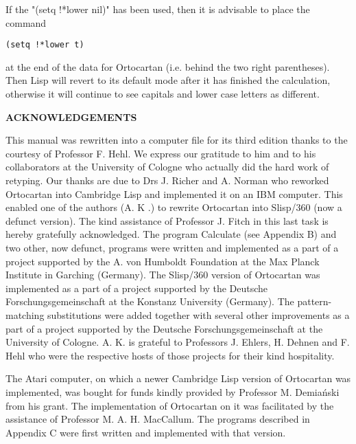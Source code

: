 If the "(setq !*lower nil)" has been used, then it is advisable to place the
command

\bigskip

\begin{verbatim}
(setq !*lower t)
\end{verbatim}

\bigskip

\noindent at the end of the data for Ortocartan (i.e. behind the two right
parentheses). Then Lisp will revert to its default mode after it has finished
the calculation, otherwise it will continue to see capitals and lower case
letters as different.

\bigskip

\bigskip

\bigskip

\centerline {\Large {\bf {ACKNOWLEDGEMENTS}}}

\nopagebreak

\bigskip

This manual was rewritten into a computer file for  its
     third  edition  thanks to the courtesy of Professor F. Hehl.
     We express our gratitude to him and to his  collaborators  at
     the  University of Cologne who actually did the hard work of
     retyping. Our thanks are due to Drs J. Richer and A.  Norman
who reworked Ortocartan into Cambridge Lisp  and  implemented it on an IBM
computer. This enabled one of the authors (A. K .)  to  rewrite Ortocartan into
Slisp/360  (now  a defunct version). The kind assistance of Professor J. Fitch
in this last task is hereby gratefully acknowledged. The program Calculate (see
Appendix B) and two other, now defunct, programs were written and implemented
as a part of a project supported  by  the A. von Humboldt Foundation at the Max
Planck Institute in Garching (Germany). The  Slisp/360  version  of Ortocartan
was implemented as a part of a project supported by the Deutsche
Forschungsgemeinschaft at the Konstanz University (Germany). The
pattern-matching  substitutions  were added  together with several other
improvements as a part of a project supported by the  Deutsche
Forschungsgemeinschaft at  the University of Cologne. A. K. is grateful to
Professors J. Ehlers, H. Dehnen and F.  Hehl  who  were  the  respective  hosts
of those projects for their kind hospitality.

The Atari computer, on which a newer Cambridge Lisp version of Ortocartan was
implemented, was bought for funds kindly provided by Professor M. Demia\'nski
from his grant. The implementation of Ortocartan on it was facilitated by the
assistance of Professor M. A. H. MacCallum. The programs described in Appendix
C were first written and implemented with that version.


